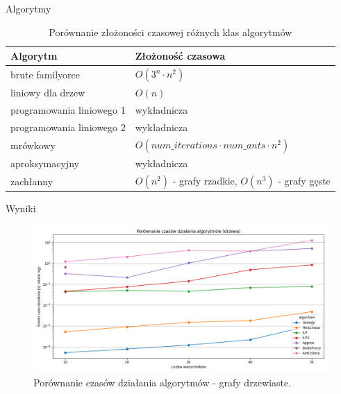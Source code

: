 \documentclass[polish,aspectratio=169]{beamer}
\begin{document}
\begin{frame}{Algorytmy}
    \begin{table}[h!]
        \centering
        \begin{tabular}{|l|l|}
        \hline
        \textbf{Algorytm} & \textbf{Złożoność czasowa} \\
        \hline
        brute familyorce & $O(3^n \cdot n^2)$ \\
        \hline
        liniowy dla drzew & $O(n)$ \\
        \hline
        programowania liniowego 1 & wykładnicza \\
        \hline
        programowania liniowego 2 & wykładnicza \\
        \hline
        mrówkowy & $O(num\_iterations \cdot num\_ants \cdot n^2)$ \\
        \hline
        aproksymacyjny & wykładnicza \\
        \hline
        zachłanny & $O(n^2)$ - grafy rzadkie, $O(n^3)$ - grafy gęste \\
        \hline
        \end{tabular}
        \caption{Porównanie złożoności czasowej różnych klas algorytmów}
        \label{tab:algorithms_complexity}
    \end{table}

\end{frame}

\begin{frame}{Wyniki}
    \begin{figure}
        \centering
        \includegraphics[width=1\textwidth]{images/trees.png}
        \caption{Porównanie czasów działania algorytmów - grafy drzewiaste.}
    \end{figure}    
\end{frame}
\end{document}
